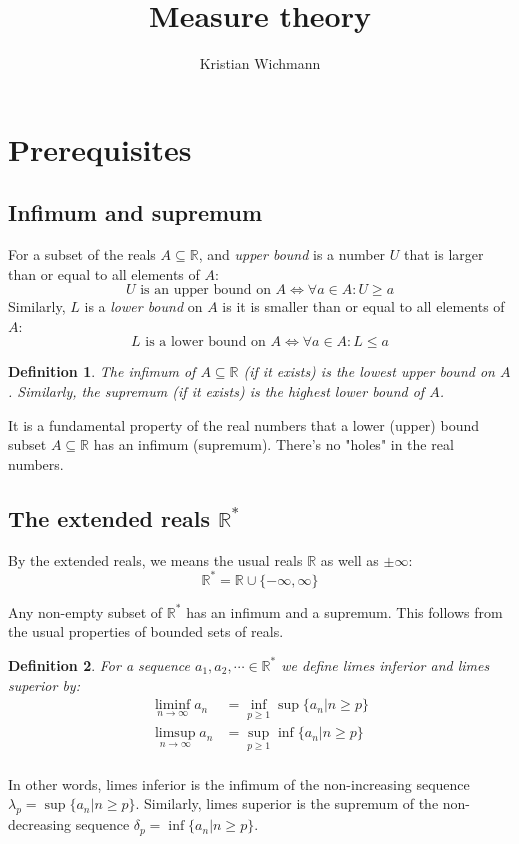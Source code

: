 \documentclass[12pt, a4paper]{article}
\title{Measure theory}
\author{Kristian Wichmann}
\newtheorem{definition}{Definition}[section]
\numberwithin{equation}{section}
\begin{document}
\maketitle

\section{Prerequisites}

\subsection{Infimum and supremum}
For a subset of the reals $A\subseteq\mathbb{R}$, and \textit{upper bound} is a number $U$ that is larger than or equal to all elements of $A$:
\begin{equation}
U\textrm{ is an upper bound on }A\Leftrightarrow\forall a\in A: U\ge a
\end{equation}
Similarly, $L$ is a \textit{lower bound} on $A$ is it is smaller than or equal to all elements of $A$:
\begin{equation}
L\textrm{ is a lower bound on }A\Leftrightarrow\forall a\in A: L\le a
\end{equation}
\begin{definition}
The \textit{infimum} of $A\subseteq\mathbb{R}$ (if it exists) is the lowest upper bound on $A$. Similarly, the \textit{supremum} (if it exists) is the highest lower bound of $A$.
\end{definition}
It is a fundamental property of the real numbers that a lower (upper) bound subset $A\subseteq\mathbb{R}$ has an infimum (supremum). There's no "holes" in the real numbers.

\subsection{The extended reals $\mathbb{R}^*$}
By the extended reals, we means the usual reals $\mathbb{R}$ as well as $\pm\infty$:
\begin{equation}
\mathbb{R}^*=\mathbb{R}\cup\{-\infty,\infty\}
\end{equation} 

Any non-empty subset of $\mathbb{R}^*$ has an infimum and a supremum. This follows from the usual properties of bounded sets of reals.

\begin{definition}
For a sequence $a_1,a_2,\cdots\in\mathbb{R}^*$ we define \textit{limes inferior} and \textit{limes superior} by:
\begin{align}
\liminf_{n\rightarrow\infty}a_n&=\inf_{p\ge 1}\sup\{a_n|n\ge p\}\\
\limsup_{n\rightarrow\infty}a_n&=\sup_{p\ge 1}\inf\{a_n|n\ge p\}\\
\end{align}
\end{definition}
In other words, limes inferior is the infimum of the non-increasing sequence $\lambda_p=\sup\{a_n|n\ge p\}$. Similarly, limes superior is the supremum of the non-decreasing sequence $\delta_p=\inf\{a_n|n\ge p\}$.
\end{document}

